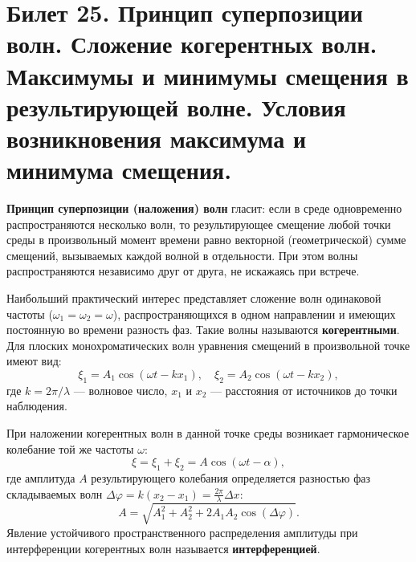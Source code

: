 \section{Билет 25. Принцип суперпозиции волн. Сложение когерентных волн. Максимумы и минимумы смещения в результирующей волне. Условия возникновения максимума и минимума смещения.}

\begin{definition}
\textbf{Принцип суперпозиции (наложения) волн} гласит: если в среде одновременно распространяются несколько волн, то результирующее смещение любой точки среды в произвольный момент времени равно векторной (геометрической) сумме смещений, вызываемых каждой волной в отдельности. При этом волны распространяются независимо друг от друга, не искажаясь при встрече.
\end{definition}

\begin{definition}
Наибольший практический интерес представляет сложение волн одинаковой частоты ($\omega_1 = \omega_2 = \omega$), распространяющихся в одном направлении и имеющих постоянную во времени разность фаз. Такие волны называются \textbf{когерентными}. Для плоских монохроматических волн уравнения смещений в произвольной точке имеют вид:
\begin{equation}
    \xi_1 = A_1 \cos(\omega t - k x_1), \quad \xi_2 = A_2 \cos(\omega t - k x_2),
\end{equation}
где $k = 2\pi/\lambda$ --- волновое число, $x_1$ и $x_2$ --- расстояния от источников до точки наблюдения.
\end{definition}

\begin{theorem}
При наложении когерентных волн в данной точке среды возникает гармоническое колебание той же частоты $\omega$:
\begin{equation}
    \xi = \xi_1 + \xi_2 = A \cos(\omega t - \alpha),
\end{equation}
где амплитуда $A$ результирующего колебания определяется разностью фаз складываемых волн $\Delta\varphi = k(x_2 - x_1) = \frac{2\pi}{\lambda}\Delta x$:
\begin{equation}
    A = \sqrt{A_1^2 + A_2^2 + 2A_1 A_2 \cos(\Delta\varphi)}. \label{eq:res_amp_25}
\end{equation}
Явление устойчивого пространственного распределения амплитуды при интерференции когерентных волн называется \textbf{интерференцией}.
\end{theorem}


